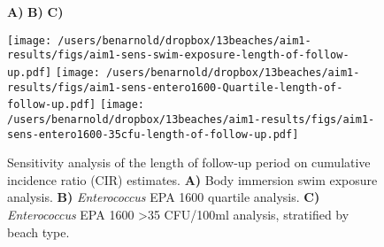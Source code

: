 \documentclass[11pt]{article}
\begin{document}
\begin{landscape}
\begin{figure}[htbp]
{\LARGE \hspace{1cm} \textbf{A)} \hspace{7cm} \textbf{B)}    \hspace{7cm} \textbf{C)}
} \\

\begin{center}
 \texttt{[image: /users/benarnold/dropbox/13beaches/aim1-results/figs/aim1-sens-swim-exposure-length-of-follow-up.pdf]} 
 \texttt{[image: /users/benarnold/dropbox/13beaches/aim1-results/figs/aim1-sens-entero1600-Quartile-length-of-follow-up.pdf]} 
  \texttt{[image: /users/benarnold/dropbox/13beaches/aim1-results/figs/aim1-sens-entero1600-35cfu-length-of-follow-up.pdf]} 

\begin{minipage}{1.2\textwidth}

\caption{Sensitivity analysis of the length of follow-up period on cumulative incidence ratio (CIR) estimates. \textbf{A)} Body immersion swim exposure analysis. \textbf{B)} \textit{Enterococcus} EPA 1600 quartile analysis. \textbf{C)} \textit{Enterococcus} EPA 1600 >35 CFU/100ml analysis, stratified by beach type.  }
\label{fig:fulengthsens}
\end{minipage}
\end{center}
\end{figure}
\end{landscape}
\end{document}
